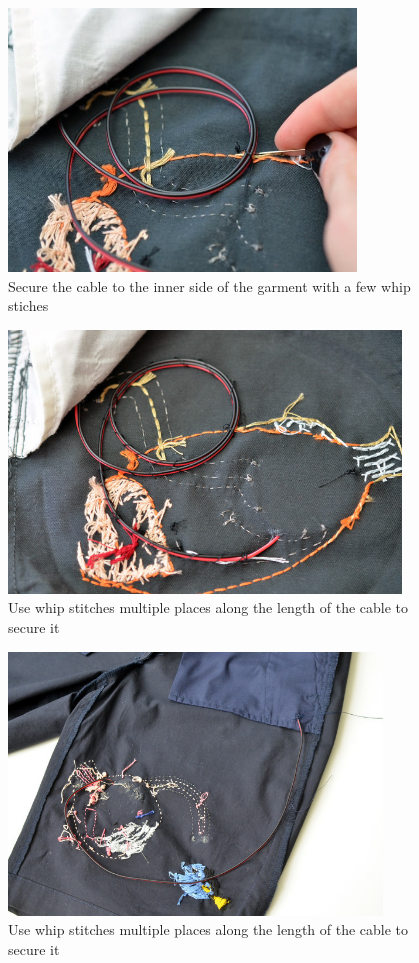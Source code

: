 \documentclass[letterpaper,twoside,12pt]{article}
\begin{document}
\begin{figure}[hbpt]\begin{centering}%
\includegraphics[height=2.75in]{flora-angler-embroidery-32.jpg}
\caption{Secure the cable to the inner side of the garment with a few whip stiches}
\label{fig:flora-angler-embroidery-32}
\end{centering}\end{figure}
\begin{figure}[hbpt]\begin{centering}%
\includegraphics[height=2.75in]{flora-angler-embroidery-33.jpg}
\caption{Use whip stitches multiple places along the length of the cable to 
secure it}
\label{fig:flora-angler-embroidery-33}
\end{centering}\end{figure}
\begin{figure}[hbpt]\begin{centering}%
\includegraphics[height=2.75in]{flora-angler-embroidery-35.jpg}
\caption{Use whip stitches multiple places along the length of the cable to 
secure it}
\label{fig:flora-angler-embroidery-35}
\end{centering}\end{figure}
\end{document}
